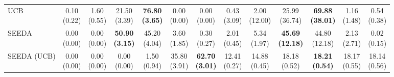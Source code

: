 \begin{table}[H]
{\begin{tabular}{l|cccccc|cccccc}
UCB & \makecell{0.10 \\ (0.22)} & \makecell{1.60 \\ (0.55)} & {\cellcolor[HTML]{C8E6C9}} \makecell{21.50 \\ (3.39)} & \bfseries \makecell{76.80 \\ (3.65)} & \makecell{0.00 \\ (0.00)} & \makecell{0.00 \\ (0.00)} & \makecell{0.43 \\ (3.09)} & \makecell{2.00 \\ (12.00)} & {\cellcolor[HTML]{C8E6C9}} \makecell{25.99 \\ (36.74)} & \bfseries \makecell{69.88 \\ (38.01)} & \makecell{1.16 \\ (1.48)} & \makecell{0.54 \\ (0.38)} \\
SEEDA & \makecell{0.00 \\ (0.00)} & \makecell{0.00 \\ (0.00)} & {\cellcolor[HTML]{C8E6C9}} \bfseries \makecell{50.90 \\ (3.15)} & \makecell{45.20 \\ (4.04)} & \makecell{3.60 \\ (1.85)} & \makecell{0.30 \\ (0.27)} & \makecell{2.01 \\ (0.45)} & \makecell{5.34 \\ (1.97)} & {\cellcolor[HTML]{C8E6C9}} \bfseries \makecell{45.69 \\ (12.18)} & \makecell{44.80 \\ (12.18)} & \makecell{2.13 \\ (2.71)} & \makecell{0.02 \\ (0.15)} \\
SEEDA (UCB) & \makecell{0.00 \\ (0.00)} & \makecell{0.00 \\ (0.00)} & {\cellcolor[HTML]{C8E6C9}} \makecell{0.00 \\ (0.00)} & \makecell{1.50 \\ (0.94)} & \makecell{35.80 \\ (3.91)} & \bfseries \makecell{62.70 \\ (3.01)} & \makecell{12.41 \\ (0.27)} & \makecell{14.88 \\ (0.45)} & {\cellcolor[HTML]{C8E6C9}} \makecell{18.18 \\ (0.52)} & \bfseries \makecell{18.21 \\ (0.54)} & \makecell{18.17 \\ (0.55)} & \makecell{18.14 \\ (0.56)} \\

\end{tabular}}
\end{table}
